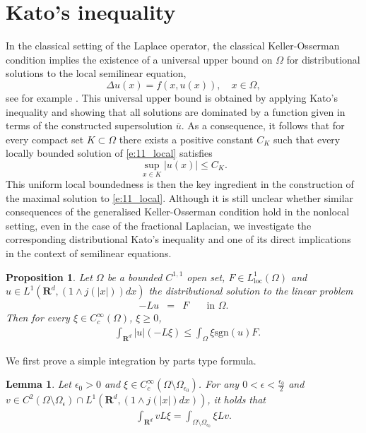 \documentclass[a4paper,12pt,draft]{article}
\theoremstyle{plain}
\newtheorem{prop}[thm]{Proposition}
\newtheorem{lemma}[thm]{Lemma}
\theoremstyle{definition}
\numberwithin{equation}{section}
\newcommand{\rd}{\mathbf{R}^d}
\newcommand\R{\mathbf{R}}
\renewcommand{\le}{\leqslant}
\renewcommand{\leq}{\leqslant}
\renewcommand{\ge}{\geqslant}
\newcommand{\1}{1}
\begin{document}
\section{Kato's inequality}

In the classical setting of the Laplace operator, the classical Keller-Osserman condition implies the existence of a universal upper bound on $\Omega$ for distributional solutions to the local semilinear equation, 
\begin{equation}\label{e:11_local}
\Delta u(x)=f(x,u(x)),\quad x\in\Omega,
\end{equation}
see for example \cite[Section 3.1, Theorem 4.1.2]{MV}. This universal upper bound is obtained by applying Kato's inequality and showing that all solutions are dominated by a function given in terms of the constructed supersolution $\overline{u}$. As a consequence, it follows that for every compact set $K\subset \Omega$ there exists a positive constant $C_K$ such that every locally bounded solution of \eqref{e:11_local} satisfies
\begin{equation}\label{e:uniform_bdd}
\sup_{x\in K} |u(x)|\le C_K.
\end{equation}
This uniform local boundedness is then the key ingredient in the construction of the maximal solution to \eqref{e:11_local}. Although it is still unclear whether similar consequences of the generalised Keller-Osserman condition hold in the nonlocal setting, even in the case of the fractional Laplacian, we investigate the corresponding distributional Kato's inequality and one of its direct implications in the context of semilinear equations. 



\begin{prop}\label{prop:kato-distrbution}
Let $\Omega$ be a bounded $C^{1,1}$ open set, $F\in L^1_\text{loc}(\Omega)$ and $u\in L^1(\rd, (1\wedge j(|x|))dx)$ the distributional solution to the linear problem
\begin{equation}\label{e:Kato2}
\begin{array}{rcll}
		-Lu&=& F& \quad \text{in } \Omega.
	\end{array}
\end{equation}
Then for every $\xi\in C_c^\infty(\Omega)$, $\xi\ge 0$,
\begin{align}
&\int_{\R^d}|u|(-L\xi)\leq \int_{\Omega}\xi \text{sgn}(u)F.\label{e:kato3} 
\end{align}
\end{prop}
We first prove a simple integration by parts type formula.
\begin{lemma} \label{lemma:ibp}
Let $\epsilon_0>0$ and $\xi \in C^{\infty}_c(\Omega\setminus \Omega_{\epsilon_0})$. For any $0<\epsilon<\frac{\epsilon_0}{2}$ and $v\in C^2(\Omega\setminus\Omega_{\epsilon}) \cap L^1(\rd, (1\wedge j(|x|)dx))$, it holds that 
\begin{align} \label{dist-kato-IBP}
    \int_{\rd} v L\xi = \int_{\Omega\setminus\Omega_{\epsilon_0}} \xi Lv . 
\end{align}
\end{lemma}
\end{document}
